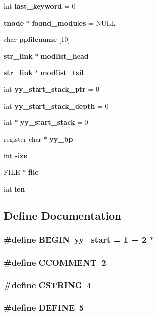 \begin{CompactItemize}
\item 
int {\bf last\_\-keyword} = 0
\item 
{\bf tnode} $\ast$ {\bf found\_\-modules} = NULL
\item 
char {\bf ppfilename} [10]
\item 
{\bf str\_\-link} $\ast$ {\bf modlist\_\-head}
\item 
{\bf str\_\-link} $\ast$ {\bf modlist\_\-tail}
\item 
int {\bf yy\_\-start\_\-stack\_\-ptr} = 0
\item 
int {\bf yy\_\-start\_\-stack\_\-depth} = 0
\item 
int $\ast$ {\bf yy\_\-start\_\-stack} = 0
\item 
register char $\ast$ {\bf yy\_\-bp}
\item 
int {\bf size}
\item 
FILE $\ast$ {\bf file}
\item 
int {\bf len}
\end{CompactItemize}


\subsection{Define Documentation}
\subsubsection{\setlength{\rightskip}{0pt plus 5cm}\#define BEGIN\ {\bf yy\_\-start} = 1 + 2 $\ast$}\label{lexer_8c_a24}


\subsubsection{\setlength{\rightskip}{0pt plus 5cm}\#define CCOMMENT\ 2}\label{lexer_8c_a59}


\subsubsection{\setlength{\rightskip}{0pt plus 5cm}\#define CSTRING\ 4}\label{lexer_8c_a61}


\subsubsection{\setlength{\rightskip}{0pt plus 5cm}\#define DEFINE\ 5}\label{lexer_8c_a62}


